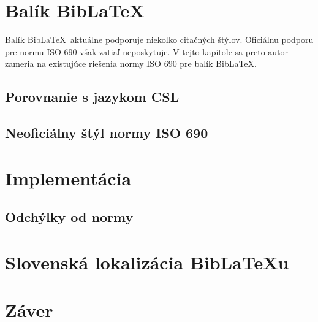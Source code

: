 \documentclass{fithesis3}
\begin{document}
\chapter{Balík Bib\LaTeX}
Balík Bib\LaTeX\, aktuálne podporuje niekoľko citačných štýlov. Oficiálnu podporu pre normu ISO 690 však zatiaľ neposkytuje. V tejto kapitole sa preto autor zameria na existujúce riešenia normy ISO 690 pre balík Bib\LaTeX.

	\section{Porovnanie s jazykom CSL}
	\section{Neoficiálny štýl normy ISO 690}

\chapter{Implementácia}
	\section{Odchýlky od normy}

\chapter{Slovenská lokalizácia Bib\LaTeX u}

\chapter{Záver}
\end{document}
